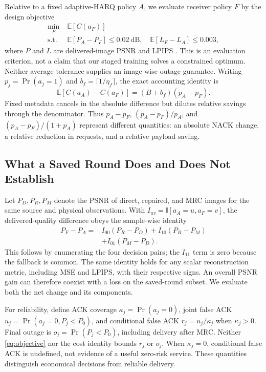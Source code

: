 \documentclass[conference]{IEEEtran}
\begin{document}
Relative to a fixed adaptive-HARQ policy $A$, we evaluate receiver policy $F$
by the design objective
\begin{align}
 \min_F\;&\mathbb E[C(a_F)]\nonumber\\
 \text{s.t. }&\mathbb E[P_A-P_F]\leq0.02~\mathrm{dB},\quad
              \mathbb E[L_F-L_A]\leq0.003,
 \label{eq:objective}
\end{align}
where $P$ and $L$ are delivered-image PSNR and LPIPS \cite{lpips}. This is an
evaluation criterion, not a claim that our staged training solves a constrained
optimum. Neither average tolerance supplies an image-wise outage guarantee.
Writing $p_j=\Pr(a_j=1)$ and $b_f=\lceil1/\eta_f\rceil$, the exact accounting
identity is
\begin{equation}
 \mathbb E[C(a_A)-C(a_F)]=(B+b_f)(p_A-p_F).
 \label{eq:identitycost}
\end{equation}
Fixed metadata cancels in the absolute difference but dilutes relative savings
through the denominator. Thus $p_A-p_F$, $(p_A-p_F)/p_A$, and
$(p_A-p_F)/(1+p_A)$ represent different quantities: an absolute NACK change,
a relative reduction in requests, and a relative payload saving.

\subsection{What a Saved Round Does and Does Not Establish}
Let $P_D,P_R,P_M$ denote the PSNR of direct, repaired, and MRC images for
the same source and physical observations. With $I_{uv}=\mathbb I[a_A=u,a_F=v]$,
the delivered-quality difference obeys the sample-wise identity
\begin{align}
 P_F-P_A={}&I_{00}(P_R-P_D)+I_{10}(P_R-P_M)\nonumber\\
          &+I_{01}(P_M-P_D).
 \label{eq:decomposition}
\end{align}
This follows by enumerating the four decision pairs; the $I_{11}$ term is
zero because the fallback is common. The same identity holds for any scalar
reconstruction metric, including MSE and LPIPS, with their respective signs.
An overall PSNR gain can therefore coexist with a loss on the saved-round
subset. We evaluate both the net change and its components.

For reliability, define ACK coverage $\kappa_j=\Pr(a_j=0)$, joint false ACK
$u_j=\Pr(a_j=0,P_j<P_0)$, and conditional false ACK
$r_j=u_j/\kappa_j$ when $\kappa_j>0$. Final outage is
$o_j=\Pr(P_j<P_0)$, including delivery after MRC. Neither
\eqref{eq:objective} nor the cost identity bounds $r_j$ or $o_j$.
When $\kappa_j=0$, conditional false ACK is undefined, not evidence of a
useful zero-risk service. These quantities distinguish economical decisions
from reliable delivery.
\end{document}
